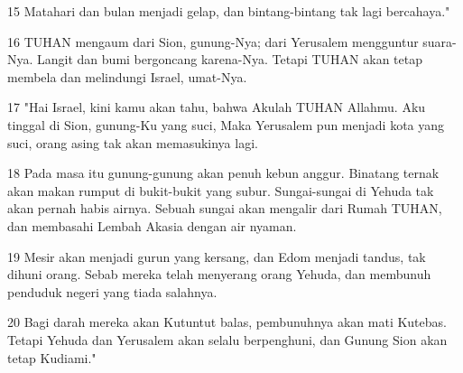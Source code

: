 \par 15 Matahari dan bulan menjadi gelap, dan bintang-bintang tak lagi bercahaya."
\par 16 TUHAN mengaum dari Sion, gunung-Nya; dari Yerusalem mengguntur suara-Nya. Langit dan bumi bergoncang karena-Nya. Tetapi TUHAN akan tetap membela dan melindungi Israel, umat-Nya.
\par 17 "Hai Israel, kini kamu akan tahu, bahwa Akulah TUHAN Allahmu. Aku tinggal di Sion, gunung-Ku yang suci, Maka Yerusalem pun menjadi kota yang suci, orang asing tak akan memasukinya lagi.
\par 18 Pada masa itu gunung-gunung akan penuh kebun anggur. Binatang ternak akan makan rumput di bukit-bukit yang subur. Sungai-sungai di Yehuda tak akan pernah habis airnya. Sebuah sungai akan mengalir dari Rumah TUHAN, dan membasahi Lembah Akasia dengan air nyaman.
\par 19 Mesir akan menjadi gurun yang kersang, dan Edom menjadi tandus, tak dihuni orang. Sebab mereka telah menyerang orang Yehuda, dan membunuh penduduk negeri yang tiada salahnya.
\par 20 Bagi darah mereka akan Kutuntut balas, pembunuhnya akan mati Kutebas. Tetapi Yehuda dan Yerusalem akan selalu berpenghuni, dan Gunung Sion akan tetap Kudiami."


